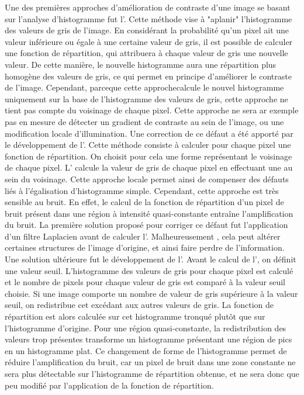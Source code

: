 \documentclass[\main/main.tex]{subfiles}
\begin{document}
%
Une des premières approches d'amélioration de contraste d'une image se basant sur l'analyse d'histogramme fut l'\he{}.
%
Cette méthode vise à "aplanir" l'histogramme des valeurs de gris de l'image.
%
En considérant la probabilité qu'un pixel ait une valeur inférieure ou égale à une certaine valeur de gris,
il est possible de calculer une fonction de répartition, qui attribuera à chaque valeur de gris une nouvelle valeur. De cette manière, le nouvelle histogramme aura une répartition plus homogène des valeurs de gris, ce qui permet en principe d'améliorer le contraste de l'image.
%
Cependant, parceque cette approchecalcule le nouvel histogramme uniquement sur la base de l'histogramme des valeurs de gris, cette approche ne tient pas compte du voisinage de chaque pixel. Cette approche ne sera ar exemple pas en mesure de détecter un gradient de contraste au sein de l'image, ou une modification locale d'illumination.
%
Une correction de ce défaut a été apporté par le développement de l'\ahe{}\cite{hummel_1977}. Cette méthode consiste à calculer pour chaque pixel une fonction de répartition.
%
On choisit pour cela une forme représentant le voisinage de chaque pixel. L'\ahe{} calcule  la valeur de gris de chaque pixel en effectuant une \he{} au sein du voisinage. Cette approche locale permet ainsi de compenser des défauts liés à l'égalisation d'histogramme simple.
Cependant, cette approche est très sensible au bruit. En effet, le calcul de la fonction de répartition d'un pixel de bruit présent dans une région à intensité quasi-constante entraîne l'amplification du bruit.
%
La première solution proposé pour corriger ce défaut fut l'application d'un filtre Laplacien avant de calculer l'\ahe{}\cite{hummel_1977}. Malheureusement , cela peut altérer certaines structures de l'image d'origine, et ainsi faire perdre de l'information.
%
Une solution ultérieure fut le développement de l'\clahe{}\cite{pizer_1987}. Avant le calcul de l'\clahe{}, on définit une valeur seuil. L'histogramme des valeurs de gris pour chaque pixel est calculé et le nombre de pixels pour chaque valeur de gris est comparé à la valeur seuil choisie. Si une image comporte un nombre de valeur de gris supérieure à la valeur seuil, on redistribue cet excédant aux autres valeurs de gris. La fonction de répartition est alors calculée sur cet histogramme tronqué plutôt que sur l'histogramme d'origine.
%
Pour une région quasi-constante, la redistribution des valeurs trop présentes transforme un histogramme présentant une région de pics en un histogramme plat. Ce changement de forme de l'histogramme permet de réduire l'amplification du bruit, car un pixel de bruit dans une zone constante ne sera plus détectable sur l'histogramme de répartition obtenue, et ne sera donc que peu modifié par l'application de la fonction de répartition.
\end{document}
